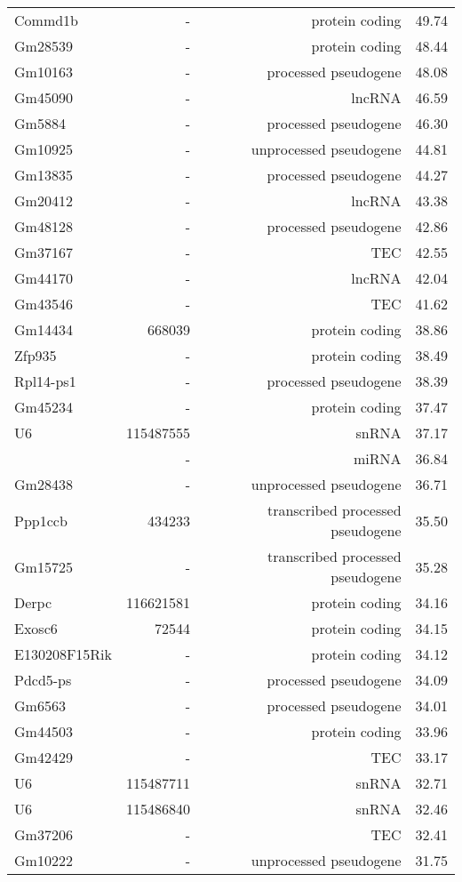 \begin{longtable}[t]{lrrr}
Commd1b & - & protein coding & 49.74\\
Gm28539 & - & protein coding & 48.44\\
Gm10163 & - & processed pseudogene & 48.08\\
\addlinespace
Gm45090 & - & lncRNA & 46.59\\
Gm5884 & - & processed pseudogene & 46.30\\
Gm10925 & - & unprocessed pseudogene & 44.81\\
Gm13835 & - & processed pseudogene & 44.27\\
Gm20412 & - & lncRNA & 43.38\\
\addlinespace
Gm48128 & - & processed pseudogene & 42.86\\
Gm37167 & - & TEC & 42.55\\
Gm44170 & - & lncRNA & 42.04\\
Gm43546 & - & TEC & 41.62\\
Gm14434 & 668039 & protein coding & 38.86\\
\addlinespace
Zfp935 & - & protein coding & 38.49\\
Rpl14-ps1 & - & processed pseudogene & 38.39\\
Gm45234 & - & protein coding & 37.47\\
U6 & 115487555 & snRNA & 37.17\\
 & - & miRNA & 36.84\\
\addlinespace
Gm28438 & - & unprocessed pseudogene & 36.71\\
Ppp1ccb & 434233 & transcribed processed pseudogene & 35.50\\
Gm15725 & - & transcribed processed pseudogene & 35.28\\
Derpc & 116621581 & protein coding & 34.16\\
Exosc6 & 72544 & protein coding & 34.15\\
\addlinespace
E130208F15Rik & - & protein coding & 34.12\\
Pdcd5-ps & - & processed pseudogene & 34.09\\
Gm6563 & - & processed pseudogene & 34.01\\
Gm44503 & - & protein coding & 33.96\\
Gm42429 & - & TEC & 33.17\\
\addlinespace
U6 & 115487711 & snRNA & 32.71\\
U6 & 115486840 & snRNA & 32.46\\
Gm37206 & - & TEC & 32.41\\
Gm10222 & - & unprocessed pseudogene & 31.75\\

\end{longtable}
